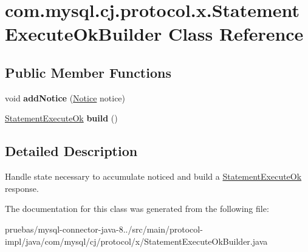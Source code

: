 \hypertarget{classcom_1_1mysql_1_1cj_1_1protocol_1_1x_1_1_statement_execute_ok_builder}{}\section{com.\+mysql.\+cj.\+protocol.\+x.\+Statement\+Execute\+Ok\+Builder Class Reference}
\label{classcom_1_1mysql_1_1cj_1_1protocol_1_1x_1_1_statement_execute_ok_builder}
\subsection*{Public Member Functions}
\begin{DoxyCompactItemize}
\item 
\mbox{\label{classcom_1_1mysql_1_1cj_1_1protocol_1_1x_1_1_statement_execute_ok_builder_a5605d2cf927622739cdd15b9b4ac9f58}} 
void {\bfseries add\+Notice} (\mbox{\hyperlink{classcom_1_1mysql_1_1cj_1_1protocol_1_1x_1_1_notice}{Notice}} notice)
\item 
\mbox{\label{classcom_1_1mysql_1_1cj_1_1protocol_1_1x_1_1_statement_execute_ok_builder_ab26041f70ee82ba7709d193a5ec1db2f}} 
\mbox{\hyperlink{classcom_1_1mysql_1_1cj_1_1protocol_1_1x_1_1_statement_execute_ok}{Statement\+Execute\+Ok}} {\bfseries build} ()
\end{DoxyCompactItemize}


\subsection{Detailed Description}
Handle state necessary to accumulate noticed and build a \mbox{\hyperlink{classcom_1_1mysql_1_1cj_1_1protocol_1_1x_1_1_statement_execute_ok}{Statement\+Execute\+Ok}} response. 

The documentation for this class was generated from the following file\+:\begin{DoxyCompactItemize}
\item 
pruebas/mysql-\/connector-\/java-\/8../src/main/protocol-\/impl/java/com/mysql/cj/protocol/x/Statement\+Execute\+Ok\+Builder.\+java\end{DoxyCompactItemize}
